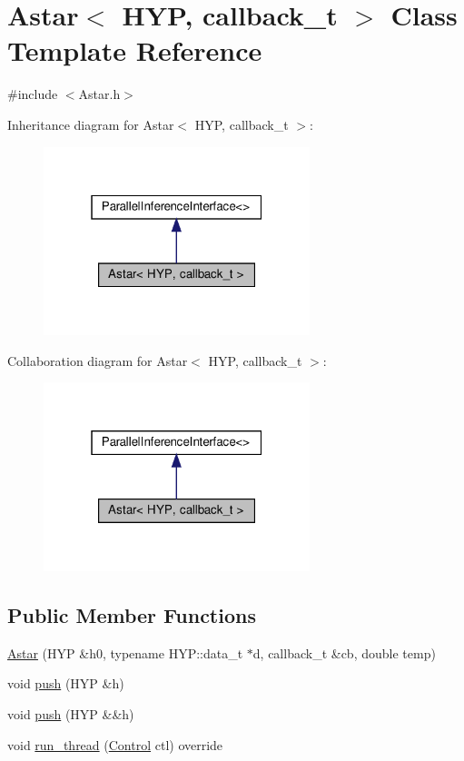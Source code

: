 \hypertarget{class_astar}{}\section{Astar$<$ H\+YP, callback\+\_\+t $>$ Class Template Reference}
\label{class_astar}


{\ttfamily \#include $<$Astar.\+h$>$}



Inheritance diagram for Astar$<$ H\+YP, callback\+\_\+t $>$\+:
\nopagebreak
\begin{figure}[H]
\begin{center}
\leavevmode
\includegraphics[width=220pt]{class_astar__inherit__graph}
\end{center}
\end{figure}


Collaboration diagram for Astar$<$ H\+YP, callback\+\_\+t $>$\+:
\nopagebreak
\begin{figure}[H]
\begin{center}
\leavevmode
\includegraphics[width=220pt]{class_astar__coll__graph}
\end{center}
\end{figure}
\subsection*{Public Member Functions}
\begin{DoxyCompactItemize}
\item 
\hyperlink{class_astar_a5735f0f775bbaf1e2280b3220602596b}{Astar} (H\+YP \&h0, typename H\+Y\+P\+::data\+\_\+t $\ast$d, callback\+\_\+t \&cb, double temp)
\item 
void \hyperlink{class_astar_adc632480077c990ab12f88a85709b76f}{push} (H\+YP \&h)
\item 
void \hyperlink{class_astar_a689ddbddae5f21f26053d2d376c34095}{push} (H\+YP \&\&h)
\item 
void \hyperlink{class_astar_a962d234b6b109597c03516d61ff2cffc}{run\+\_\+thread} (\hyperlink{struct_control}{Control} ctl) override
\end{DoxyCompactItemize}
